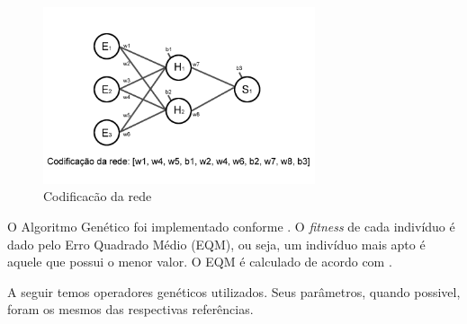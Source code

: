 \documentclass[12pt]{article}
\begin{document}
\begin{figure}[ht]
\centering
\includegraphics[width=80mm]{codificacao.png}
\caption{Codificacão da rede}
\label{fig:nn}
\end{figure}

\par O Algoritmo Genético foi implementado conforme \cite{essentials}. O \textit{fitness} de cada indivíduo é dado pelo Erro Quadrado Médio (EQM), ou seja, um indivíduo mais apto é aquele que possui o menor valor. O EQM é calculado de acordo com \cite{Liu}. 

\par A seguir temos operadores genéticos utilizados. Seus parâmetros, quando possivel, foram os mesmos das respectivas referências.
\end{document}
